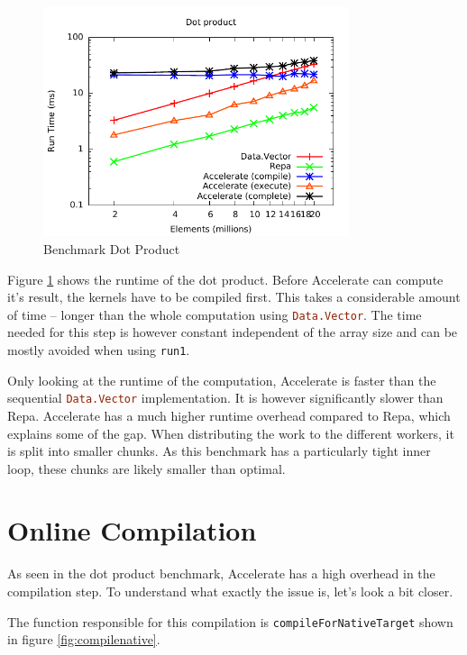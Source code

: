 \documentclass[a4paper,bibliography=totocnumbered,parskip,headsepline]{scrbook}
\begin{document}
\begin{figure}
    \centering
    \includegraphics[width=0.8\textwidth]{images/benchmarks/dotp/dotp}
    \caption{Benchmark Dot Product}
    \label{fig:dotpbench}
\end{figure}

Figure \ref{fig:dotpbench} shows the runtime of the dot product.
Before Accelerate can compute it's result, the kernels have to be compiled first.
This takes a considerable amount of time -- longer than the whole computation using \lstinline[language=haskell]{Data.Vector}.
The time needed for this step is however constant independent of the array size and can be mostly avoided when using \lstinline[language=haskell]{run1}.

Only looking at the runtime of the computation, Accelerate is faster than the sequential \lstinline[language=haskell]{Data.Vector} implementation.
It is however significantly slower than Repa.
Accelerate has a much higher runtime overhead compared to Repa, which explains some of the gap.
When distributing the work to the different workers, it is split into smaller chunks.
As this benchmark has a particularly tight inner loop, these chunks are likely smaller than optimal.

\section{Online Compilation}
As seen in the dot product benchmark, Accelerate has a high overhead in the compilation step.
To understand what exactly the issue is, let's look a bit closer.

The function responsible for this compilation is \lstinline[language=haskell]{compileForNativeTarget} shown in figure \ref{fig:compilenative}.
\end{document}
